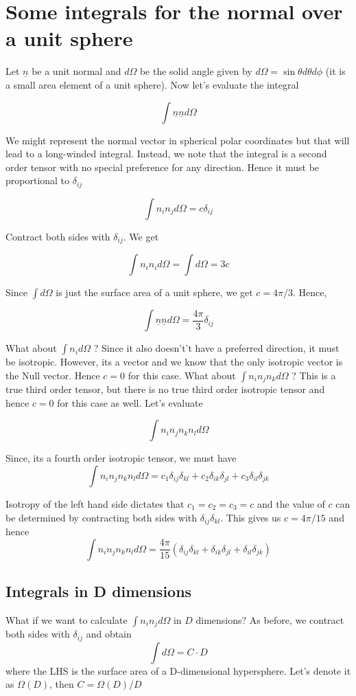 \documentclass[11pt, letterpaper]{article}
\newcommand{\dl}{\delta}
\newcommand{\1}{\bm{1}}
\newcommand{\un}[1]{\underline{#1}}
\begin{document}
\section{Some integrals for the normal over a unit sphere}

Let $\un{n}$ be a unit normal and $d\Omega$ be the solid angle given by $d\Omega = \sin\theta d\theta d\phi$ (it is a small area element of a unit sphere). Now let's evaluate the integral

$$\int \un{n}\un{n}d\Omega$$

We might represent the normal vector in spherical polar coordinates but that will lead to a long-winded integral. Instead, we note that the integral is a second order tensor with no special preference for any direction. Hence it must be proportional to $\dl_{ij}$

$$\int n_i n_j d\Omega = c \dl_{ij}$$

Contract both sides with $\dl_{ij}$. We get

$$\int n_i n_i d\Omega = \int d\Omega = 3c$$

Since $\int d\Omega$ is just the surface area of a unit sphere, we get $c = 4\pi / 3$. Hence,

$$\int \un{n}\un{n}d\Omega = \frac{4\pi}{3} \dl_{ij}$$

What about $\int n_i d\Omega$ ? Since it also doesn't't have a preferred direction, it must be isotropic. However, its a vector and we know that the only isotropic vector is the Null vector. Hence $c=0$ for this case. What about $\int n_i n_j n_k d\Omega$ ? This is a true third order tensor, but there is no true third order isotropic tensor and hence $c=0$ for this case as well. Let's evaluate

$$\int n_in_jn_kn_l d\Omega$$

Since, its a fourth order isotropic tensor, we must have
$$
\int n_in_jn_kn_l d\Omega = c_1\dl_{ij}\dl_{kl} + c_2\dl_{ik}\dl_{jl} + c_3\dl_{il}\dl_{jk}
$$

Isotropy of the left hand side dictates that $c_1=c_2=c_3=c$ and the value of $c$ can be determined by contracting both sides with $\dl_{ij}\dl_{kl}$. This gives us $c=4\pi/15$ and hence
$$
\int n_in_jn_kn_l d\Omega = \frac{4\pi}{15}(\dl_{ij}\dl_{kl} + \dl_{ik}\dl_{jl} + \dl_{il}\dl_{jk})
$$

\subsection{Integrals in D dimensions}
What if we want to calculate $\int n_in_j d\Omega$ in $D$ dimensions? As before, we contract both sides with $\dl_{ij}$ and obtain
$$
\int d\Omega = C\cdot D
$$
where the LHS is the surface area of a D-dimensional hypersphere. Let's denote it as $\Omega(D)$, then $C=\Omega(D)/D$
\end{document}
